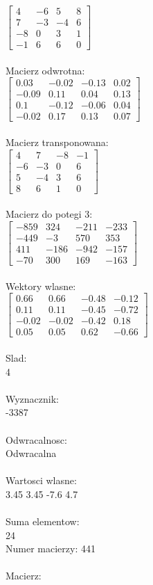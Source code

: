 \documentclass[a4paper,12pt]{article}
\begin{document}
$\begin{bmatrix} 4&-6&5&8\\7&-3&-4&6\\-8&0&3&1\\-1&6&6&0 \end{bmatrix}$
\\
\\
Macierz odwrotna:\\

$\begin{bmatrix} 0.03&-0.02&-0.13&0.02\\-0.09&0.11&0.04&0.13\\0.1&-0.12&-0.06&0.04\\-0.02&0.17&0.13&0.07 \end{bmatrix}$
\\
\\
Macierz transponowana:\\

$\begin{bmatrix} 4&7&-8&-1\\-6&-3&0&6\\5&-4&3&6\\8&6&1&0 \end{bmatrix}$
\\
\\
Macierz do potegi 3:\\

$\begin{bmatrix} -859&324&-211&-233\\-449&-3&570&353\\411&-186&-942&-157\\-70&300&169&-163 \end{bmatrix}$
\\
\\
Wektory wlasne:\\

$\begin{bmatrix} 0.66&0.66&-0.48&-0.12\\0.11&0.11&-0.45&-0.72\\-0.02&-0.02&-0.42&0.18\\0.05&0.05&0.62&-0.66 \end{bmatrix}$
\\
\\
Slad:\\
4
\\
\\
Wyznacznik:\\
-3387
\\
\\
Odwracalnosc:\\
Odwracalna
\\
\\
Wartosci wlasne:\\
3.45 3.45 -7.6 4.7
\\
\\
Suma elementow:\\
24
\\
\newpage
Numer macierzy:
441
\\
\\
Macierz:\\
\end{document}

